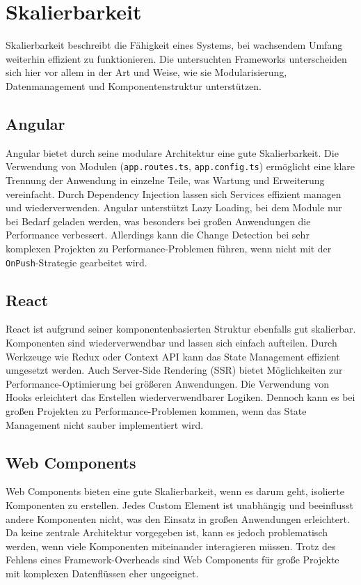\documentclass[oneside]{ausarbeitung}
\begin{document}
\section{Skalierbarkeit}

Skalierbarkeit beschreibt die Fähigkeit eines Systems, bei wachsendem Umfang weiterhin effizient zu funktionieren. Die untersuchten Frameworks unterscheiden sich hier vor allem in der Art und Weise, wie sie Modularisierung, Datenmanagement und Komponentenstruktur unterstützen.

\subsection{Angular}

Angular bietet durch seine modulare Architektur eine gute Skalierbarkeit. Die Verwendung von Modulen (\texttt{app.routes.ts}, \texttt{app.config.ts}) ermöglicht eine klare Trennung der Anwendung in einzelne Teile, was Wartung und Erweiterung vereinfacht. Durch Dependency Injection lassen sich Services effizient managen und wiederverwenden. Angular unterstützt Lazy Loading, bei dem Module nur bei Bedarf geladen werden, was besonders bei großen Anwendungen die Performance verbessert. Allerdings kann die Change Detection bei sehr komplexen Projekten zu Performance-Problemen führen, wenn nicht mit der \texttt{OnPush}-Strategie gearbeitet wird.

\subsection{React}

React ist aufgrund seiner komponentenbasierten Struktur ebenfalls gut skalierbar. Komponenten sind wiederverwendbar und lassen sich einfach aufteilen. Durch Werkzeuge wie Redux oder Context API kann das State Management effizient umgesetzt werden. Auch Server-Side Rendering (SSR) bietet Möglichkeiten zur Performance-Optimierung bei größeren Anwendungen. Die Verwendung von Hooks erleichtert das Erstellen wiederverwendbarer Logiken. Dennoch kann es bei großen Projekten zu Performance-Problemen kommen, wenn das State Management nicht sauber implementiert wird.

\subsection{Web Components}

Web Components bieten eine gute Skalierbarkeit, wenn es darum geht, isolierte Komponenten zu erstellen. Jedes Custom Element ist unabhängig und beeinflusst andere Komponenten nicht, was den Einsatz in großen Anwendungen erleichtert. Da keine zentrale Architektur vorgegeben ist, kann es jedoch problematisch werden, wenn viele Komponenten miteinander interagieren müssen. Trotz des Fehlens eines Framework-Overheads sind Web Components für große Projekte mit komplexen Datenflüssen eher ungeeignet.
\end{document}
